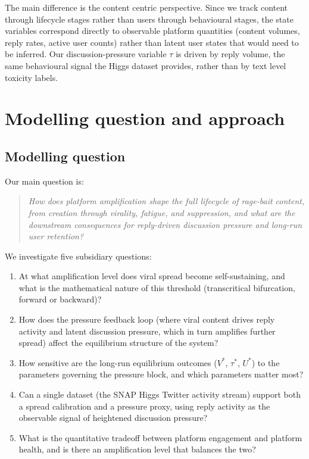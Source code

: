 \documentclass[11pt]{article}
\begin{document}
The main difference is the content centric perspective. Since we track content through lifecycle stages rather than users through behavioural stages, the state variables correspond directly to observable platform quantities (content volumes, reply rates, active user counts) rather than latent user states that would need to be inferred. Our discussion-pressure variable $\tau$ is driven by reply volume, the same behavioural signal the Higgs dataset provides, rather than by text level toxicity labels.


\newpage
\section{Modelling question and approach}
\label{sec:question}

\subsection{Modelling question}

Our main question is:
\begin{quote}
\emph{How does platform amplification shape the full lifecycle of rage-bait content, from creation through virality, fatigue, and suppression, and what are the downstream consequences for reply-driven discussion pressure and long-run user retention?}
\end{quote}

We investigate five subsidiary questions:
\begin{enumerate}[leftmargin=1.5em]
    \item At what amplification level does viral spread become self-sustaining, and what is the mathematical nature of this threshold (transcritical bifurcation, forward or backward)?
    \item How does the pressure feedback loop (where viral content drives reply activity and latent discussion pressure, which in turn amplifies further spread) affect the equilibrium structure of the system?
    \item How sensitive are the long-run equilibrium outcomes ($V^*$, $\tau^*$, $U^*$) to the parameters governing the pressure block, and which parameters matter most?
    \item Can a single dataset (the SNAP Higgs Twitter activity stream) support both a spread calibration and a pressure proxy, using reply activity as the observable signal of heightened discussion pressure?
    \item What is the quantitative tradeoff between platform engagement and platform health, and is there an amplification level that balances the two?
\end{enumerate}
\end{document}
